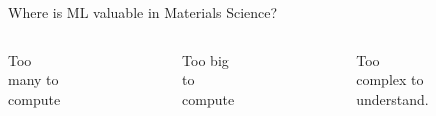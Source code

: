 \documentclass[aspectratio=169]{beamer}
\begin{document}
\begin{frame}[t]{Where is ML valuable in Materials Science?}
    \begin{columns}[t]
    Too many to compute
    \begin{figure}
        \centering
        \includegraphics[width=\textwidth]{lectures/slides_tex/mp_data_hist.png}
    \end{figure}
Too big to compute
\begin{figure}
        \centering
        \includegraphics[width=\textwidth]{lectures/slides_tex/mpea_poly.png}
    \end{figure}
Too complex to understand.
\begin{figure}

\end{figure}
\end{columns}
\end{frame}
\end{document}

